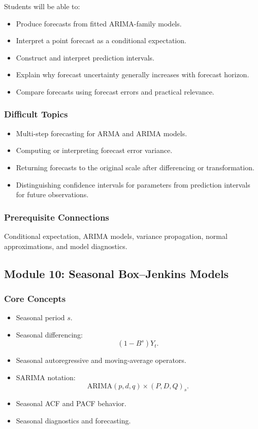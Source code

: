 \documentclass[11pt]{article}
\begin{document}
Students will be able to:

\begin{itemize}
    \item Produce forecasts from fitted ARIMA-family models.
    \item Interpret a point forecast as a conditional expectation.
    \item Construct and interpret prediction intervals.
    \item Explain why forecast uncertainty generally increases with forecast
    horizon.
    \item Compare forecasts using forecast errors and practical relevance.
\end{itemize}

\subsubsection{Difficult Topics}

\begin{itemize}
    \item Multi-step forecasting for ARMA and ARIMA models.
    \item Computing or interpreting forecast error variance.
    \item Returning forecasts to the original scale after differencing or
    transformation.
    \item Distinguishing confidence intervals for parameters from prediction
    intervals for future observations.
\end{itemize}

\subsubsection{Prerequisite Connections}

Conditional expectation, ARIMA models, variance propagation, normal
approximations, and model diagnostics.

\subsection{Module 10: Seasonal Box--Jenkins Models}

\subsubsection{Core Concepts}

\begin{itemize}
    \item Seasonal period \(s\).
    \item Seasonal differencing:
    \[
    (1-B^s)Y_t.
    \]
    \item Seasonal autoregressive and moving-average operators.
    \item SARIMA notation:
    \[
    \text{ARIMA}(p,d,q)\times(P,D,Q)_s.
    \]
    \item Seasonal ACF and PACF behavior.
    \item Seasonal diagnostics and forecasting.
\end{itemize}
\end{document}
